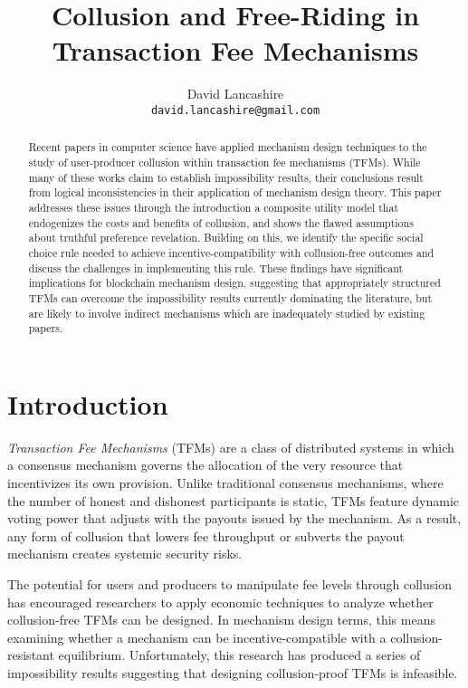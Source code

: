 \documentclass[oneside]{article}   	%
\title{Collusion and Free-Riding in Transaction Fee Mechanisms}
\author{
  David Lancashire\\
  \texttt{david.lancashire@gmail.com}\\
}
\begin{document}
\maketitle


\begin{abstract}
Recent papers in computer science have applied mechanism design techniques to the study of user-producer collusion within transaction fee mechanisms (TFMs). While many of these works claim to establish impossibility results, their conclusions result from logical inconsistencies in their application of mechanism design theory. This paper addresses these issues through the introduction a composite utility model that endogenizes the costs and benefits of collusion, and shows the flawed assumptions about truthful preference revelation. Building on this, we identify the specific social choice rule needed to achieve incentive-compatibility with collusion-free outcomes and discuss the challenges in implementing this rule. These findings have significant implications for blockchain mechanism design, suggesting that appropriately structured TFMs can overcome the impossibility results currently dominating the literature, but are likely to involve indirect mechanisms which are inadequately studied by existing papers.
\end{abstract}

\section{Introduction \label{sec::introduction}}

\emph{Transaction Fee Mechanisms} (TFMs) are a class of distributed systems in which a consensus mechanism governs the allocation of the very resource that incentivizes its own provision. Unlike traditional consensus mechanisms, where the number of honest and dishonest participants is static, TFMs feature dynamic voting power that adjusts with the payouts issued by the mechanism. As a result, any form of collusion that lowers fee throughput or subverts the payout mechanism creates systemic security risks.

The potential for users and producers to manipulate fee levels through collusion has encouraged researchers to apply economic techniques to analyze whether collusion-free TFMs can be designed. In mechanism design terms, this means examining whether a mechanism can be incentive-compatible with a collusion-resistant equilibrium. Unfortunately, this research has produced a series of impossibility results suggesting that designing collusion-proof TFMs is infeasible.
\end{document}
